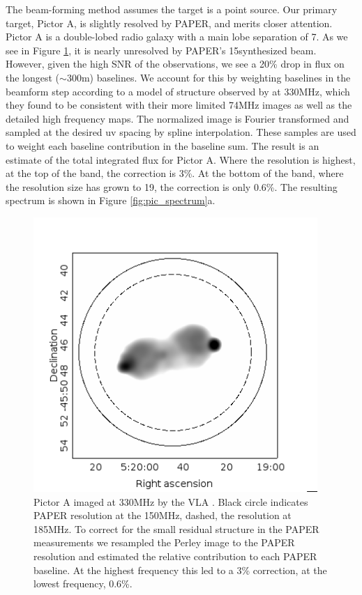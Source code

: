 \documentclass[preprint]{aastex}
\begin{document}
The beam-forming method assumes the target is a point source. Our primary
target, Pictor A, is slightly resolved by PAPER, and merits closer attention.
Pictor A is a double-lobed radio galaxy with a main lobe separation of
7\arcmin. As we see in Figure \ref{fig:pic_perley}, it is nearly unresolved by
PAPER's 15\arcmin synthesized beam. However, given the high SNR of the
observations, we see a 20\% drop in flux on the longest ($\sim$300m) baselines. 
We account for this by weighting baselines
in the beamform step according to a model of structure observed by
\citet{Perley:1997p9312} at 330MHz, which they found to be consistent with
their more limited 74MHz images as well as the detailed high frequency maps.
The normalized image is Fourier transformed and sampled at the desired uv
spacing by spline interpolation. These samples are used to weight each baseline
contribution in the baseline sum. The result is an estimate of the total
integrated flux for Pictor A. Where the resolution is highest, at the top of
the band, the correction is 3\%. At the bottom of the band, where the
resolution size has grown to 19\arcmin, the correction is only 0.6\%. The
resulting spectrum is shown in Figure \ref{fig:pic_spectrum}a.



\begin{figure}
\includegraphics[width=0.96\textwidth]{plots/picA_Perley.png}
\caption{
Pictor A imaged at 330MHz by the VLA \citep{Perley:1997p9312}. Black circle
indicates PAPER resolution at the 150MHz, dashed, the resolution at 185MHz.  To
correct for the small residual structure in the PAPER measurements we resampled
the Perley image to the PAPER resolution and estimated the relative contribution
 to each PAPER baseline.  At the highest frequency this
led to a 3\% correction, at the lowest frequency, 0.6\%.
\label{fig:pic_perley}}
\end{figure}
\end{document}
